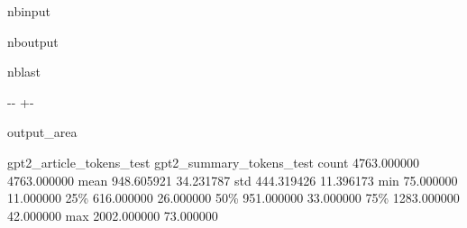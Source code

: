 \documentclass[letterpaper,10pt,english]{sphinxmanual}
\newlength\nbsphinxcodecellspacing
\begin{document}
\begin{sphinxuseclass}{nbinput}
{
\begin{sphinxVerbatim}[commandchars=\\\{\}]
\llap{\color{nbsphinxin}[73]:\,\hspace{\fboxrule}\hspace{\fboxsep}} \PYG{p}{[} \PYG{p}{]}
\end{sphinxVerbatim}
}

\end{sphinxuseclass}
\begin{sphinxuseclass}{nboutput}
\begin{sphinxuseclass}{nblast}
{

\kern-\sphinxverbatimsmallskipamount\kern-\baselineskip
\kern+\FrameHeightAdjust\kern-\fboxrule
\vspace{\nbsphinxcodecellspacing}

\begin{sphinxuseclass}{output_area}
\begin{sphinxuseclass}{}


\begin{sphinxVerbatim}[commandchars=\\\{\}]
\llap{\color{nbsphinxout}[73]:\,\hspace{\fboxrule}\hspace{\fboxsep}}       gpt2\_article\_tokens\_test  gpt2\_summary\_tokens\_test
count               4763.000000               4763.000000
mean                 948.605921                 34.231787
std                  444.319426                 11.396173
min                   75.000000                 11.000000
25\%                  616.000000                 26.000000
50\%                  951.000000                 33.000000
75\%                 1283.000000                 42.000000
max                 2002.000000                 73.000000
\end{sphinxVerbatim}



\end{sphinxuseclass}
\end{sphinxuseclass}
}

\end{sphinxuseclass}
\end{sphinxuseclass}
\end{document}
